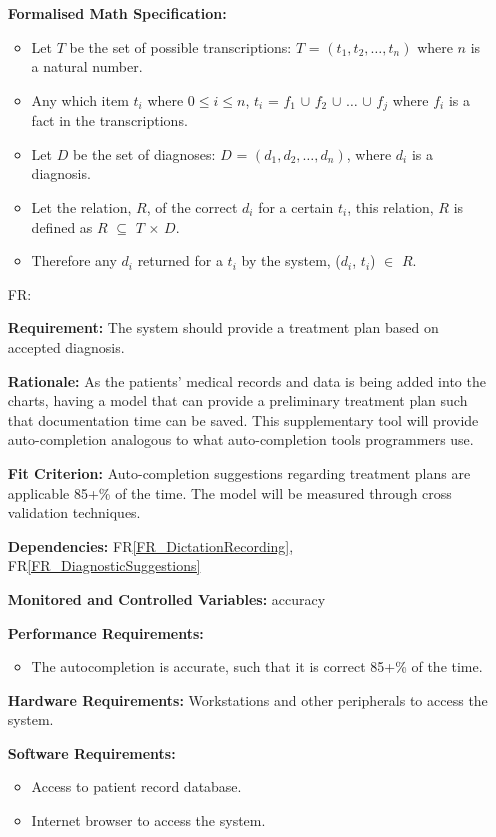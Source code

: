 \documentclass[12pt]{article}
\newcounter{reqnum} %
\begin{document}
\begin{itemize}
  \textbf{Formalised Math Specification:}
    \begin{itemize}
      \item Let $T$ be the set of possible transcriptions: $T$ = $(t_1, t_2, \ldots, t_n)$ where $n$ is a natural number.
      \item Any which item $t_i$ where $0 \leq i \leq n$, $t_i$ = $f_1$ $\cup$ $f_2$ $\cup$ $\ldots$ $\cup$ $f_j$ where $f_i$ is a fact in the transcriptions.
      \item Let $D$ be the set of diagnoses: $D$ = $(d_1, d_2, \ldots, d_n)$, where $d_i$ is a diagnosis.
      \item Let the relation, $R$, of the correct $d_i$ for a certain $t_i$, this relation, $R$ is defined as $R$ $\subseteq$ $T$ $\times$ $D$.
      \item Therefore any $d_i$ returned for a $t_i$ by the system, ($d_i$, $t_i$) $\in$ $R$.
    \end{itemize}
  
  
  \item[FR\refstepcounter{reqnum}\thereqnum \label{FR_medicalSuggestions}:] 
  
  \textbf{Requirement:} The system should provide a treatment plan based on accepted diagnosis.
  
  \textbf{Rationale:} As the patients' medical records and data is being added into the charts, having a model that can provide a preliminary treatment plan such that documentation time can be saved. This supplementary tool will provide auto-completion analogous to what auto-completion tools programmers use.
  
  \textbf{Fit Criterion:} Auto-completion suggestions regarding treatment plans are applicable 85+\% of the time. The model will be measured through cross validation techniques.
   
  \textbf{Dependencies:} FR\ref{FR_DictationRecording}, FR\ref{FR_DiagnosticSuggestions}
  
  \textbf{Monitored and Controlled Variables:} accuracy
  
  \textbf{Performance Requirements:}
  \begin{itemize}
    \item The autocompletion is accurate, such that it is correct 85+\% of the time. 
  \end{itemize}
  
  \textbf{Hardware Requirements:} 
  Workstations and other peripherals to access the system.
  
  \textbf{Software Requirements:}
  \begin{itemize}
    \item Access to patient record database.
    \item Internet browser to access the system. 
  \end{itemize}
  

\end{itemize}
\end{document}
